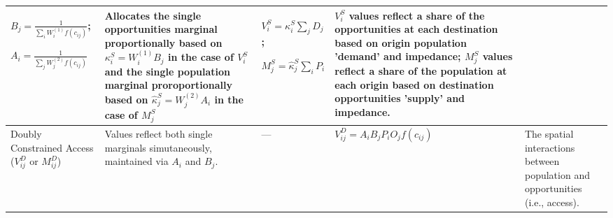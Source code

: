 {\begin{longtable}{|p{2.5cm}|p{2.5cm}|p{2.5cm}|p{3cm}|p{3cm}|}
$B_j = \frac{1}{\sum_i W_i^{(1)} f(c_{ij})}$;

$A_i = \frac{1}{\sum_j W_j^{(2)} f(c_{ij})}$

& Allocates the single opportunities marginal proportionally based on $\kappa^S_i = W_i^{(1)} B_j$ in the case of $V_i^S$ and the single population marginal proroportionally based on $\hat \kappa^S_j = W_j^{(2)} A_i$ in the case of $M_j^S$

& $V^S_i = \kappa^S_i \sum_j D_j$;

$M_j^S = \hat \kappa^S_j \sum_i P_i$

& $V^S_i$ values reflect a share of the opportunities at each destination based on origin population 'demand' and impedance; $M^S_j$ values reflect a share of the population at each origin based on destination opportunities 'supply' and impedance.\\
\hline

Doubly Constrained Access ($V_{ij}^D$ or $M_{ij}^D$)
& Values reflect both single marginals simutaneously, maintained via $A_i$ and $B_j$.
& —
& $V_{ij}^D = A_i B_j P_i O_j f(c_{ij})$
& The spatial interactions between population and opportunities (i.e., access). \\
\hline

\end{longtable}
}

